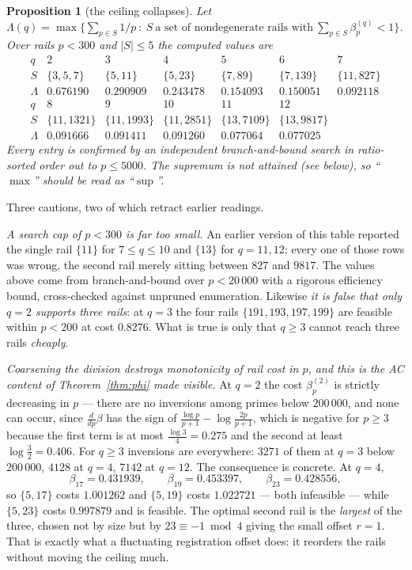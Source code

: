 \documentclass[11pt]{article}
\newtheorem{proposition}[theorem]{Proposition}
\begin{document}
\begin{proposition}[the ceiling collapses]\label{prop:ceiling}
Let $\Lambda(q)=\max\bigl\{\sum_{p\in S}1/p\ :\ S\ \text{a set of nondegenerate rails with}\
\sum_{p\in S}\beta_p^{(q)}<1\bigr\}$.  Over rails $p<300$ and $|S|\le5$ the computed values
are
\[
\begin{array}{r|cccccc}
q & 2 & 3 & 4 & 5 & 6 & 7\\\hline
S & \{3,5,7\} & \{5,11\} & \{5,23\} & \{7,89\} & \{7,139\} & \{11,827\}\\
\Lambda & 0.676190 & 0.290909 & 0.243478 & 0.154093 & 0.150051 & 0.092118\\[2pt]\hline
q & 8 & 9 & 10 & 11 & 12 & \\\hline
S & \{11,1321\} & \{11,1993\} & \{11,2851\} & \{13,7109\} & \{13,9817\} & \\
\Lambda & 0.091666 & 0.091411 & 0.091260 & 0.077064 & 0.077025 &
\end{array}
\]
Every entry is confirmed by an independent branch-and-bound search in ratio-sorted order out
to $p\le5000$.  The supremum is not attained (see below), so ``$\max$'' should be read as
``$\sup$''.
\end{proposition}

Three cautions, two of which retract earlier readings.

\emph{A search cap of $p<300$ is far too small.}  An earlier version of this table reported
the single rail $\{11\}$ for $7\le q\le10$ and $\{13\}$ for $q=11,12$; every one of those rows
was wrong, the second rail merely sitting between $827$ and $9817$.  The values above come
from branch-and-bound over $p<20\,000$ with a rigorous efficiency bound, cross-checked against
unpruned enumeration.  Likewise \emph{it is false that only $q=2$ supports three rails}: at
$q=3$ the four rails $\{191,193,197,199\}$ are feasible within $p<200$ at cost $0.8276$.  What
is true is only that $q\ge3$ cannot reach three rails \emph{cheaply}.

\emph{Coarsening the division destroys monotonicity of rail cost in $p$, and this is the AC
content of Theorem~\ref{thm:phi} made visible.}  At $q=2$ the cost $\beta_p^{(2)}$ is strictly
decreasing in $p$ --- there are no inversions among primes below $200\,000$, and none can
occur, since $\tfrac{d}{dp}\beta$ has the sign of $\tfrac{\log p}{p+1}-\log\tfrac{2p}{p+1}$,
which is negative for $p\ge3$ because the first term is at most $\tfrac{\log3}{4}=0.275$ and
the second at least $\log\tfrac32=0.406$.  For $q\ge3$ inversions are everywhere: $3271$ of
them at $q=3$ below $200\,000$, $4128$ at $q=4$, $7142$ at $q=12$.  The consequence is
concrete.  At $q=4$,
\[
  \beta_{17}=0.431939,\qquad \beta_{19}=0.453397,\qquad \beta_{23}=0.428556,
\]
so $\{5,17\}$ costs $1.001262$ and $\{5,19\}$ costs $1.022721$ --- both infeasible --- while
$\{5,23\}$ costs $0.997879$ and is feasible.  The optimal second rail is the \emph{largest} of
the three, chosen not by size but by $23\equiv-1\bmod4$ giving the small offset $r=1$.  That
is exactly what a fluctuating registration offset does: it reorders the rails without moving
the ceiling much.
\end{document}
